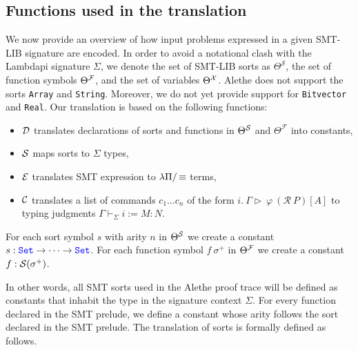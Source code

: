 \subsection{Functions used in the translation}

We now provide an overview of how input problems expressed in a given SMT-LIB signature \cite[\S 5.2.1]{smtlib} are encoded. 
In order to avoid a notational clash with the Lambdapi signature $\Sigma$, we denote the set of SMT-LIB sorts as $\Theta^\mathcal{S}$, the set of function symbols $\Theta^\cal{F}$, and the set of variables $\Theta^\cal{X}$.
Alethe does not support the sorts \texttt{Array} and \texttt{String}. Moreover, we do not yet provide support for \texttt{Bitvector} and \texttt{Real}. Our translation is based on the following functions:

\begin{itemize}
\item $\cal{D}$ translates declarations of sorts and functions in $\Theta^\cal{S}$ and $\Theta^\mathcal{F}$ into constants,
\item $\cal{S}$ maps sorts to $\Sigma$ types,
\item $\cal{E}$ translates SMT expression to $\lpm$ terms,
\item $\cal{C}$ translates a list of commands  $c_1 \dots c_n$ of the form $i.~\Gamma \triangleright~\varphi~(\mathcal{R}~P)[A]$ to typing judgments $\Gamma \vdash_\Sigma i := M: N$.
\end{itemize}

\begin{definition}
For each sort symbol $s$ with arity $n$ in $\Theta^\cal{S}$ we create a constant $s: \set \ra \dots \ra \set$.
For each function symbol $f~\sigma^+$ in $\Theta^\cal{F}$ we create a constant $f: \cal{S}(\sigma^+)$.
\end{definition}

\smallskip

In other words, all SMT sorts used in the Alethe proof trace will be defined as constants that inhabit the type \set{} in the signature context $\Sigma$.
For every function declared in the SMT prelude, we define a constant whose arity follows the sort declared in the SMT prelude. The translation of sorts is formally defined as follows.

\smallskip

